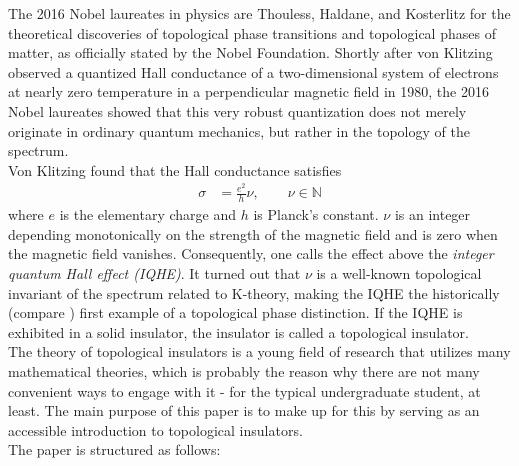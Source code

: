 \nocite{eda79af1}
\nocite{fd8cbb36}
\nocite{1706ae98}
The 2016 Nobel laureates in physics are Thouless, Haldane, and Kosterlitz {\glqq}for the theoretical discoveries of topological phase transitions and topological phases of matter{\grqq}, as officially stated by the Nobel Foundation.
Shortly after von Klitzing observed a quantized Hall conductance of a two-dimensional system of electrons at nearly zero temperature in a perpendicular magnetic field in 1980, the 2016 Nobel laureates showed that this very robust quantization does not merely originate in ordinary quantum mechanics, but rather in the topology of the spectrum.
\\
Von Klitzing found that the Hall conductance satisfies
\begin{align*}
  \sigma
  &=
  \frac{e^{2}}{h}
  \nu
  ,\qquad
  \nu
  \in
  \mathbb{N}
\end{align*}
where $e$ is the elementary charge and $h$ is Planck's constant.
$\nu$ is an integer depending monotonically on the strength of the magnetic field and is zero when the magnetic field vanishes.
Consequently, one calls the effect above the \textit{integer quantum Hall effect (IQHE)}.
It turned out that $\nu$ is a well-known topological invariant of the spectrum related to K-theory, making the IQHE the historically (compare \cite{1706ae98}) first example of a topological phase distinction.
If the IQHE is exhibited in a solid insulator, the insulator is called a topological insulator.
\\
The theory of topological insulators is a young field of research that utilizes many mathematical theories, which is probably the reason why there are not many convenient ways to engage with it - for the typical undergraduate student, at least.
The main purpose of this paper is to make up for this by serving as an accessible introduction to topological insulators.
\\
The paper is structured as follows:
